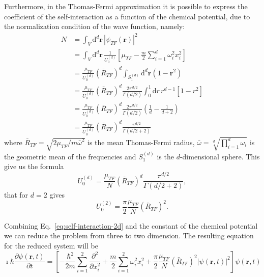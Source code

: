 Furthermore, in the Thomas-Fermi approximation it is possible to express the coefficient of the self-interaction as a function of the chemical potential, due to the normalization condition of the wave function, namely:
\begin{equation}
\begin{split}
N & = \int_V \mathrm{d}^d \textbf{r} \, |\psi_{TF}(\textbf{r})|^2 \\
& = \int_V \mathrm{d}^d \textbf{r} \, \frac{1}{U_0^{(d)}} \left[ \mu_{TF} - \frac{m}{2} \sum_{i=1}^d \omega_i^2 x_i^2 \right] \\
& = \frac{\mu_{TF}}{U_0^{(d)}} \left( \bar{R}_{TF} \right)^d \int_{S_1^{(d)}} \mathrm{d}^d \textbf{r} (1 - \textbf{r}^2) \\ 
& = \frac{\mu_{TF}}{U_0^{(d)}} \left( \bar{R}_{TF} \right)^d \frac{2\pi^{d/2}}{\Gamma(d/2)} \int_0^1 \mathrm{d}r \, r^{d-1} [1 - r^2] \\
& = \frac{\mu_{TF}}{U_0^{(d)}} \left( \bar{R}_{TF} \right)^d \frac{2\pi^{d/2}}{\Gamma(d/2)} \left( \frac{1}{d} - \frac{1}{d+2} \right) \\
& = \frac{\mu_{TF}}{U_0^{(d)}} \left( \bar{R}_{TF} \right)^d \frac{\pi^{d/2}}{\Gamma(d/2 + 2)}
\end{split}
\end{equation}
where $\bar{R}_{TF} = \sqrt{2\mu_{TF} / m \bar{\omega}^2}$ is the mean Thomas-Fermi radius, $\bar{\omega} = \sqrt[d]{\prod_{i=1}^d \omega_i}$ is the geometric mean of the frequencies and $S_1^{(d)}$ is the $d$-dimensional sphere.
This give us the formula
\begin{equation}
U_0^{(d)} = \frac{\mu_{TF}}{N} \left( \bar{R}_{TF} \right)^d \frac{\pi^{d/2}}{\Gamma(d/2 + 2)},
\end{equation}
that for $d=2$ gives
\begin{equation} \label{eq:self-interaction-2d}
U_0^{(2)} = \frac{\pi}{2} \frac{\mu_{TF}}{N} \left( \bar{R}_{TF} \right)^2.
\end{equation}

Combining Eq.~\eqref{eq:self-interaction-2d} and the constant of the chemical potential we can reduce the problem from three to two dimension. The resulting equation for the reduced system will be
\begin{equation}
\imath \hbar \frac{\partial \psi(\textbf{r}, t)}{\partial t} = \left[ - \frac{\hbar^2}{2m} \sum_{i=1}^2 \frac{\partial^2}{\partial x_i^2} + \frac{m}{2} \sum_{i=1}^2 \omega_i^2 x_i^2 + \frac{\pi}{2} \frac{\mu_{TF}}{N} \left( \bar{R}_{TF} \right)^2 |\psi(\textbf{r}, t)|^2 \right] \psi(\textbf{r}, t)
\end{equation}